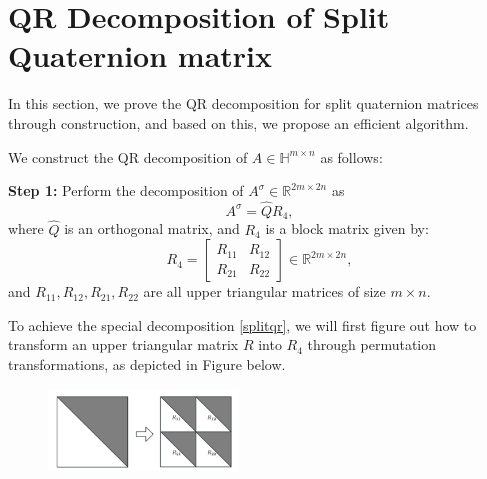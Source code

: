 \documentclass[1p]{elsarticle}
\numberwithin{equation}{section}
\begin{document}
\section{QR Decomposition of Split Quaternion matrix}
In this section, we prove the QR decomposition for split quaternion matrices through construction, and based on this, we propose an efficient algorithm.

We construct the QR decomposition of $A \in \mathbb{H}^{m \times n}$ as follows:

\textbf{Step 1:} Perform the decomposition of $A^\sigma \in \mathbb{R}^{2m \times 2n}$ as \begin{equation}\label{splitqr}A^\sigma = \hat{Q} R_4,\end{equation} where $\hat{Q}$ is an orthogonal matrix, and $R_4$ is a block matrix given by:
\begin{equation}\label{r4}
R_4 = \begin{bmatrix}
    R_{11} & R_{12} \\
    R_{21} & R_{22}
\end{bmatrix} \in \mathbb{R}^{2m \times 2n},
\end{equation}
and $R_{11}, R_{12},R_{21},R_{22}$ are all upper triangular matrices of size $m \times n$.

To achieve the special decomposition \eqref{splitqr},  we will first figure out how to transform an upper triangular matrix $R$ into $R_4$ through permutation transformations, as depicted in Figure below.
\begin{figure}[htbp]
        \centering
        \includegraphics[width=0.45\textwidth,keepaspectratio=true]{Upper triangular.png} %
         \label{fig:Upper triangular}
\end{figure}
\end{document}
